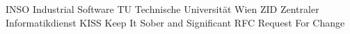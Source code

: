 	{INSO}	{Industrial Software}
	{TU}	{Technische Universit\"at Wien}
	{ZID}	{Zentraler Informatikdienst}
	{KISS}	{Keep It Sober and Significant}
	{RFC}	{Request For Change}